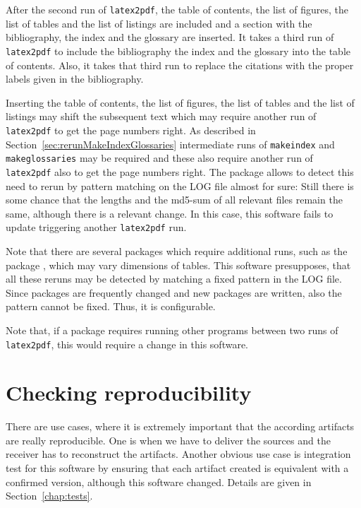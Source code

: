 After the second run of \texttt{latex2pdf}, 
the table of contents,
the list of figures, the list of tables and the list of listings 
are included and a section with the bibliography, 
the index and the glossary are inserted. 
It takes a third run of \texttt{latex2pdf} 
to include the bibliography the index and the glossary 
into the table of contents. 
Also, it takes that third run to replace the citations 
with the proper labels given in the bibliography. 

Inserting the table of contents,
the list of figures, the list of tables and the list of listings 
may shift the subsequent text 
which may require another run of \texttt{latex2pdf} 
to get the page numbers right. 
As described in Section~\ref{sec:rerunMakeIndexGlossaries} 
intermediate runs of \texttt{makeindex} and \texttt{makeglossaries} 
may be required 
and these also require another run of \texttt{latex2pdf} 
also to get the page numbers right. 
The package  allows to detect this need to rerun 
by pattern matching on the LOG file almost for sure: 
Still there is some chance 
that the lengths and the md5-sum of all relevant files 
remain the same, although there is a relevant change. 
In this case, this software fails to update 
triggering another \texttt{latex2pdf} run. 


Note that there are several packages which require additional runs, 
such as the package , 
which may vary dimensions of tables. 
This software presupposes, that all these reruns 
may be detected by matching a fixed pattern in the LOG file. 
Since packages are frequently changed and new packages are written, 
also the pattern cannot be fixed. 
Thus, it is configurable. 
 
Note that, if a package requires running other programs 
between two runs of \texttt{latex2pdf}, 
this would require a change in this software. 

\section{Checking reproducibility }\label{sec:chkReprod}

There are use cases, where it is extremely important 
that the according artifacts are really reproducible. 
One is when we have to deliver the sources 
and the receiver has to reconstruct the artifacts. 
Another obvious use case is integration test for this software 
by ensuring that each artifact created 
is equivalent with a confirmed version, 
although this software changed. 
Details are given in Section~\ref{chap:tests}. 


